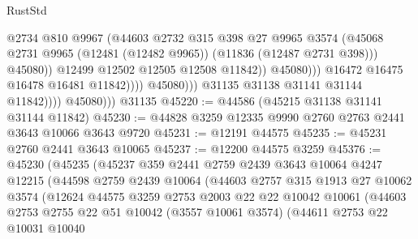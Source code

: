 \begin{lexlean}{RustStd}
\begin{coremodule}
                                            @2734
                                            @810
                                            @9967
                                            (@44603
                                              @2732
                                              @315
                                              @398
                                              @27
                                              @9965
                                              @3574
                                              (@45068
                                                @2731
                                                @9965
                                                (@12481 (@12482 @9965))
                                                (@11836 (@12487 @2731 @398)))
                                              @45080))
                                          @12499
                                          @12502
                                          @12505
                                          @12508
                                          @11842))
                                      @45080)))
                                @16472
                                @16475
                                @16478
                                @16481
                                @11842))))
                        @45080)))
                  @31135
                  @31138
                  @31141
                  @31144
                  @11842))))
          @45080)))
    @31135
@45220 := @44586 (@45215 @31138 @31141 @31144 @11842)
@45230 := @44828 @3259 @12335 @9990 @2760 @2763 @2441 @3643 @10066 @3643 @9720
@45231 := @12191 @44575
@45235 := @45231 @2760 @2441 @3643 @10065
@45237 := @12200 @44575 @3259
@45376 := @45230
    (@45235
      (@45237
        @359
        @2441
        @2759
        @2439
        @3643
        @10064
        @4247
        @12215
        (@44598
          @2759
          @2439
          @10064
          (@44603
            @2757
            @315
            @1913
            @27
            @10062
            @3574
            (@12624
              @44575
              @3259
              @2753
              @2003
              @22
              @22
              @10042
              @10061
              (@44603
                @2753
                @2755
                @22
                @51
                @10042
                (@3557 @10061 @3574)
                (@44611
                  @2753
                  @22
                  @10031
                  @10040

\end{coremodule}
\end{lexlean}
